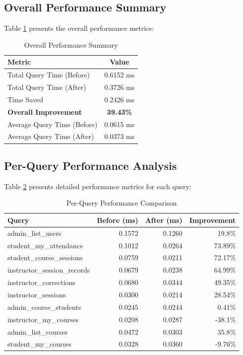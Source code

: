 \documentclass[conference]{IEEEtran}
\begin{document}
\subsection{Overall Performance Summary}

Table \ref{tab:overall_summary} presents the overall performance metrics:

\begin{table}[htbp]
\caption{Overall Performance Summary}
\begin{center}
\begin{tabular}{|l|c|}
\hline
\textbf{Metric} & \textbf{Value} \\
\hline
Total Query Time (Before) & 0.6152 ms \\
Total Query Time (After) & 0.3726 ms \\
Time Saved & 0.2426 ms \\
\textbf{Overall Improvement} & \textbf{39.43\%} \\
Average Query Time (Before) & 0.0615 ms \\
Average Query Time (After) & 0.0373 ms \\
\hline
\end{tabular}
\label{tab:overall_summary}
\end{center}
\end{table}

\subsection{Per-Query Performance Analysis}

Table \ref{tab:per_query_results} presents detailed performance metrics for each query:

\begin{table}[htbp]
\caption{Per-Query Performance Comparison}
\begin{center}
\begin{tabular}{|l|r|r|r|}
\hline
\textbf{Query} & \textbf{Before (ms)} & \textbf{After (ms)} & \textbf{Improvement} \\
\hline
admin\_list\_users & 0.1572 & 0.1260 & 19.8\% \\
student\_my\_attendance & 0.1012 & 0.0264 & 73.89\% \\
student\_course\_sessions & 0.0759 & 0.0211 & 72.17\% \\
instructor\_session\_records & 0.0679 & 0.0238 & 64.99\% \\
instructor\_corrections & 0.0680 & 0.0344 & 49.35\% \\
instructor\_sessions & 0.0300 & 0.0214 & 28.54\% \\
admin\_course\_students & 0.0245 & 0.0244 & 0.41\% \\
instructor\_my\_courses & 0.0208 & 0.0287 & -38.1\% \\
admin\_list\_courses & 0.0472 & 0.0303 & 35.8\% \\
student\_my\_courses & 0.0328 & 0.0360 & -9.76\% \\
\hline
\end{tabular}
\label{tab:per_query_results}
\end{center}
\end{table}
\end{document}
